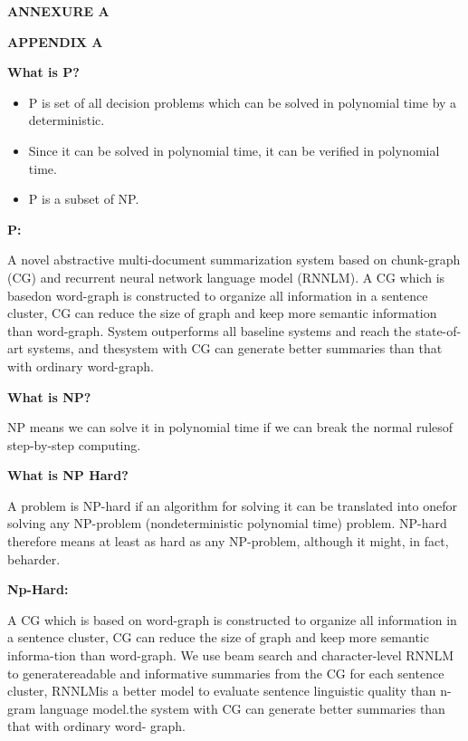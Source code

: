 \documentclass[12pt]{report}
\begin{document}
\centering
\Large\textbf{ANNEXURE A }

\centering

\Large\textbf{APPENDIX A}\\
\justifying
\setlength{\parindent}{4em}
\setlength{\parskip}{0.5em}
\renewcommand{\baselinestretch}{1.5}
\normalsize
\raggedright\textbf{What is P?}
\begin{itemize}
\item P is set of all decision problems which can be solved in polynomial time by a
deterministic.\\
\item  Since it can be solved in polynomial time, it can be verified in polynomial time.\\
\item  P is a subset of NP.
\end{itemize}

\textbf{P:}

A novel abstractive multi-document summarization system based on chunk-graph (CG) and
recurrent neural network language model (RNNLM). A CG which is basedon word-graph is 
constructed to organize all information in a sentence cluster, CG can reduce the size of graph 
and keep more semantic information than word-graph. System outperforms all baseline systems 
and reach the state-of-art systems, and thesystem with CG can generate better summaries than
that with ordinary word-graph.



\vspace{1cm}

\textbf{What is NP?
}

NP means we can solve it in polynomial time if we can break the normal rulesof step-by-step
computing.

\textbf{What is NP Hard?}

A problem is NP-hard if an algorithm for solving it can be translated into onefor solving
any NP-problem (nondeterministic polynomial time) problem. NP-hard therefore means at
least as hard as any NP-problem, although it might, in fact, beharder.

\textbf{Np-Hard:
}

A CG which is based on word-graph is constructed to organize all information in a sentence 
cluster, CG can reduce the size of graph and keep more semantic informa-tion than word-graph. 
We use beam search and character-level RNNLM to generatereadable and informative summaries
from the CG for each sentence cluster, RNNLMis a better model to evaluate sentence linguistic
quality than n-gram language model.the system with CG can generate better summaries than that 
with ordinary word- graph.
\end{document}
